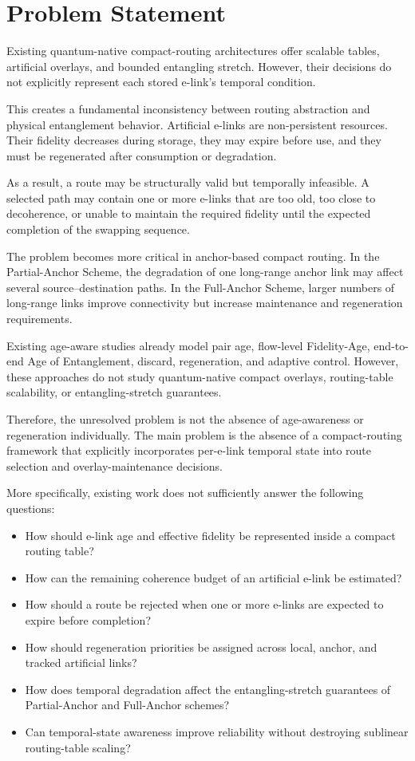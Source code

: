 \section{Problem Statement}
Existing quantum-native compact-routing architectures offer scalable tables,
artificial overlays, and bounded entangling stretch. However, their decisions
do not explicitly represent each stored e-link's temporal condition.

This creates a fundamental inconsistency between routing abstraction and physical entanglement behavior. Artificial e-links are non-persistent resources. Their fidelity decreases during storage, they may expire before use, and they must be regenerated after consumption or degradation.

As a result, a route may be structurally valid but temporally infeasible. A selected path may contain one or more e-links that are too old, too close to decoherence, or unable to maintain the required fidelity until the expected completion of the swapping sequence.

The problem becomes more critical in anchor-based compact routing. In the Partial-Anchor Scheme, the degradation of one long-range anchor link may affect several source--destination paths. In the Full-Anchor Scheme, larger numbers of long-range links improve connectivity but increase maintenance and regeneration requirements.

Existing age-aware studies already model pair age, flow-level Fidelity-Age, end-to-end Age of Entanglement, discard, regeneration, and adaptive control. However, these approaches do not study quantum-native compact overlays, routing-table scalability, or entangling-stretch guarantees.

Therefore, the unresolved problem is not the absence of age-awareness or regeneration individually. The main problem is the absence of a compact-routing framework that explicitly incorporates per-e-link temporal state into route selection and overlay-maintenance decisions.

More specifically, existing work does not sufficiently answer the following questions:

\begin{itemize}
    \item How should e-link age and effective fidelity be represented inside a compact routing table?
    \item How can the remaining coherence budget of an artificial e-link be estimated?
    \item How should a route be rejected when one or more e-links are expected to expire before completion?
    \item How should regeneration priorities be assigned across local, anchor, and tracked artificial links?
    \item How does temporal degradation affect the entangling-stretch guarantees of Partial-Anchor and Full-Anchor schemes?
    \item Can temporal-state awareness improve reliability without destroying sublinear routing-table scaling?
\end{itemize}

